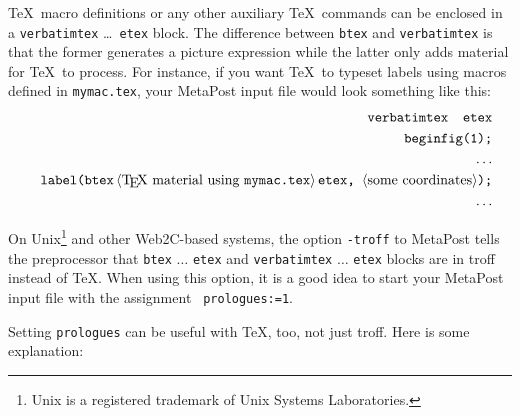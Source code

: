 \documentclass{article} %
\def\ttt{\texttt}  %
\newcommand\reg{$^{\hbox{\psyvii\char'322}}$}   %
\newcommand\descr[1]{{\langle\hbox{#1}\rangle}}
\begin{document}
\label{Dverbatimtex}
\TeX\ macro definitions or any other auxiliary \TeX\ commands can be
enclosed in a {\tt verbatimtex}
\ldots\ {\tt etex} block.  The difference
between {\tt btex} and {\tt verbatimtex} is that the former generates a
picture expression while the latter only adds material for \TeX\ to
process.  For instance, if you want \TeX\ to typeset labels using macros
defined in {\tt mymac.tex}, your MetaPost input file would look
something like this:
\begin{eqnarray*}
&& \verb|verbatimtex  etex|\\
&& \verb|beginfig(1);|\\
&& \qquad \dots\\
&& \verb|label(btex|\, \descr{\TeX\ material using \hbox{\tt mymac.tex}}\,
        \verb|etex, | \descr{some coordinates} \hbox{\tt );}\\
&& \qquad \dots
\end{eqnarray*}

On Unix\footnote{Unix is a registered trademark of Unix Systems
Laboratories.}\index{Unix\reg} and other Web2C-based systems, the option
{\tt -troff} to MetaPost tells the preprocessor that {\tt btex} $\ldots$
{\tt etex} and {\tt verbatimtex} $\ldots$ {\tt etex} blocks are in
troff instead of \TeX.  When using this option, it is a
good idea to start your MetaPost input file with the assignment {\tt
prologues:=1}. 

\label{Dprologues}
Setting \ttt{prologues} can be useful with \TeX, too, not just troff.
Here is some explanation:
\end{document}
